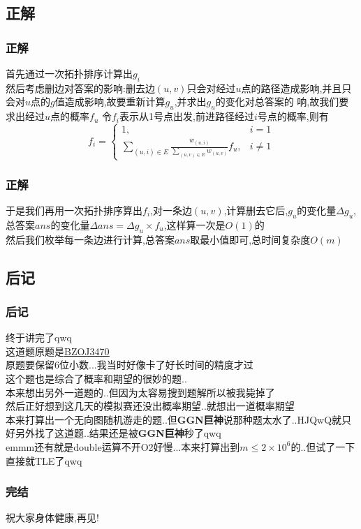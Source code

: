 \documentclass{beamer}
\begin{document}
		\subsection{正解}
			\begin{frame}\frametitle{正解}
				首先通过一次拓扑排序计算出$g_i$\\
				然后考虑删边对答案的影响:删去边$(u,v)$只会对经过$u$点的路径造成影响,并且只会对$u$点的$g$值造成影响,故要重新计算$g_u$,并求出$g_u$的变化对总答案的
				响,故我们要求出经过$u$点的概率$f_u$
				令$f_i$表示从1号点出发,前进路径经过$i$号点的概率,则有\\
				$$f_i=\begin{cases}
					1,&i=1\\
					\sum\limits_{(u,i)\in E}\frac{w_{(u,i)}}{\sum\limits_{(u,v)\in E}w_{(u,v)}}f_u,&i\neq1
				\end{cases}$$
			\end{frame}
			\begin{frame}\frametitle{正解}
				于是我们再用一次拓扑排序算出$f_i$,对一条边$(u,v)$,计算删去它后,$g_u$的变化量$\Delta g_u$,总答案$ans$的变化量$\Delta ans=\Delta g_u\times f_u$,这样算一次是$O(1)$的\\
				然后我们枚举每一条边进行计算,总答案$ans$取最小值即可,总时间复杂度$O(m)$
			\end{frame}
		\subsection{后记}
			\begin{frame}\frametitle{后记}
				终于讲完了qwq\\
				这道题原题是\underline{\href{https://darkbzoj.tk/problem/3470}{BZOJ3470}}\\
				原题要保留6位小数...我当时好像卡了好长时间的精度才过\\
				这个题也是综合了概率和期望的很妙的题..\\
				本来想出另外一道题的..但因为太容易搜到题解所以被我毙掉了\\
				然后正好想到这几天的模拟赛还没出概率期望..就想出一道概率期望\\
				本来打算出一个无向图随机游走的题..但\textbf{GGN巨神}说那种题太水了..HJQwQ就只好另外找了这道题..结果还是被\textbf{GGN巨神}秒了qwq\\
				emmm还有就是double运算不开O2好慢...本来打算出到$m\le2\times10^6$的..但试了一下直接就TLE了qwq
			\end{frame}
			\begin{frame}\frametitle{完结}
				祝大家身体健康,再见!
			\end{frame}
\end{document}
